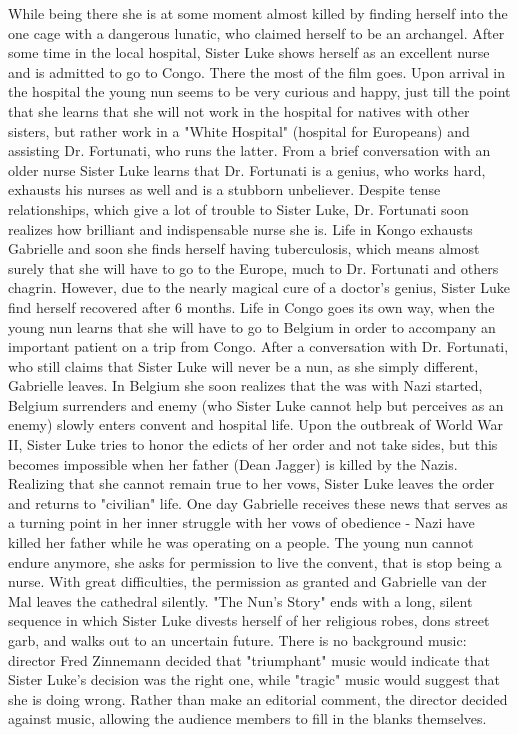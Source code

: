 \documentclass[8pt]{article} %
\begin{document}
While being there she is at some moment almost killed by finding herself into the one cage with a dangerous lunatic, who claimed herself to be an archangel. After some time in the local hospital, Sister Luke shows herself as an excellent
nurse and is admitted to go to Congo. There the most of the film goes. Upon arrival in the hospital the young nun seems to be very curious and happy, just till the point that she learns that she will not work in the hospital for natives
with other sisters, but rather work in a "White Hospital" (hospital for Europeans) and assisting Dr. Fortunati, who runs the latter. From a brief conversation with an older nurse Sister Luke learns that Dr. Fortunati is a genius,
who works hard, exhausts his nurses as well and is a stubborn unbeliever. Despite tense relationships, which give a lot of trouble to Sister Luke, Dr. Fortunati soon realizes how brilliant and indispensable nurse she is. Life in Kongo
exhausts Gabrielle and soon she finds herself having tuberculosis, which means almost surely that she will have to go to the Europe, much to Dr. Fortunati and others chagrin. However, due to the nearly magical cure of a doctor's genius,
Sister Luke find herself recovered after 6 months. Life in Congo goes its own way, when the young nun learns that she will have to go to Belgium in order to accompany an important patient on a trip from Congo. After a conversation
with Dr. Fortunati, who still claims that Sister Luke will never be a nun, as she simply different, Gabrielle leaves. In Belgium she soon realizes that the was with Nazi started, Belgium surrenders and enemy (who Sister Luke cannot
help but perceives as an enemy) slowly enters convent and hospital life. 
Upon the outbreak of World War II, Sister Luke tries to honor the edicts of her order and not take sides, but this becomes impossible when her father (Dean Jagger) is killed by the Nazis. Realizing that she cannot remain true to her vows, Sister Luke leaves the order and returns to "civilian" life.
One day Gabrielle receives these news that serves as a turning point in her inner struggle with her vows of obedience - Nazi have killed her father while he was
operating on a people. The young nun cannot endure anymore, she asks for permission to live the convent, that is stop being a nurse. With great difficulties, the permission as granted and Gabrielle van der Mal leaves the cathedral
silently. "The Nun's Story" ends with a long, silent sequence in which Sister Luke divests herself of her religious robes, dons street garb, and walks out to an uncertain future. There is no background music: director Fred Zinnemann decided that "triumphant" music would indicate that Sister Luke's decision was the right one, while "tragic" music would suggest that she is doing wrong. Rather than make an editorial comment, the director decided against music, allowing the audience members to fill in the blanks themselves.\\
\end{document}
